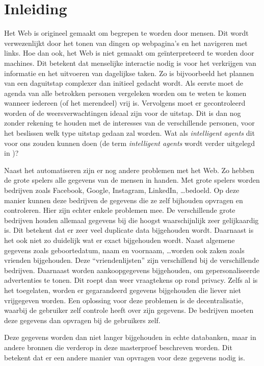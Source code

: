 \chapter{Inleiding}
Het Web is origineel gemaakt om begrepen te worden door mensen. Dit wordt verwezenlijkt door het tonen van dingen op webpagina's en het navigeren met links. Hoe dan ook, het Web is niet gemaakt om geïnterpreteerd te worden door machines. Dit betekent dat menselijke interactie nodig is voor het verkrijgen van informatie en het uitvoeren van dagelijkse taken. Zo is bijvoorbeeld het plannen van een daguitstap complexer dan initieel gedacht wordt. Als eerste moet de agenda van alle betrokken personen vergeleken worden om te weten te komen wanneer iedereen (of het merendeel) vrij is. Vervolgens moet er gecontroleerd worden of de weersverwachtingen ideaal zijn voor de uitstap. Dit is dan nog zonder rekening te houden met de interesses van de verschillende personen, voor het beslissen welk type uitstap gedaan zal worden. Wat als \textit{intelligent agents} dit voor ons zouden kunnen doen (de term \textit{intelligent agents} wordt verder uitgelegd in )?

Naast het automatiseren zijn er nog andere problemen met het Web. Zo hebben de grote spelers alle gegevens van de mensen in handen. Met grote spelers worden bedrijven zoals Facebook, Google, Instagram, LinkedIn, \dots bedoeld. Op deze manier kunnen deze bedrijven de gegevens die ze zelf bijhouden opvragen en controleren. Hier zijn echter enkele problemen mee. De verschillende grote bedrijven houden allemaal gegevens bij die hoogst waarschijnlijk zeer gelijkaardig is. Dit betekent dat er zeer veel duplicate data bijgehouden wordt. Daarnaast is het ook niet zo duidelijk wat er exact bijgehouden wordt. Naast algemene gegevens zoals geboortedatum, naam en voornaam, \dots worden ook zaken zoals vrienden bijgehouden. Deze ``vriendenlijsten'' zijn verschillend bij de verschillende bedrijven. Daarnaast worden aankoopgegevens bijgehouden, om gepersonaliseerde advertenties te tonen. Dit roept dan weer vraagtekens op rond privacy. Zelfs al is het toegelaten, worden er gegarandeerd gegevens bijgehouden die liever niet vrijgegeven worden. Een oplossing voor deze problemen is de decentralisatie, waarbij de gebruiker zelf controle heeft over zijn gegevens. De bedrijven moeten deze gegevens dan opvragen bij de gebruikers zelf. 

Deze gegevens worden dan niet langer bijgehouden in echte databanken, maar in andere bronnen die verderop in deze masterproef beschreven worden. Dit betekent dat er een andere manier van opvragen voor deze gegevens nodig is.

